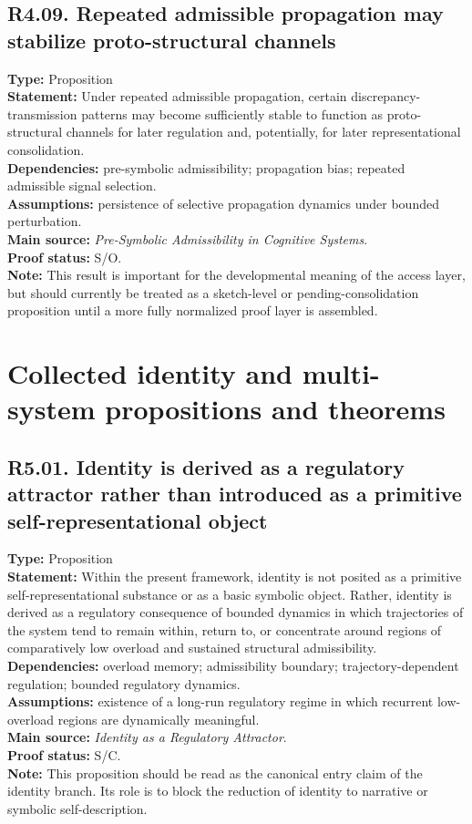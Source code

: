 \documentclass[12pt]{article}
\begin{document}
	\subsection*{R4.09. Repeated admissible propagation may stabilize proto-structural channels}
	\textbf{Type:} Proposition \\
	\textbf{Statement:} Under repeated admissible propagation, certain discrepancy-transmission
	patterns may become sufficiently stable to function as proto-structural channels for later
	regulation and, potentially, for later representational consolidation. \\
	\textbf{Dependencies:} pre-symbolic admissibility; propagation bias; repeated admissible signal
	selection. \\
	\textbf{Assumptions:} persistence of selective propagation dynamics under bounded perturbation. \\
	\textbf{Main source:} \emph{Pre-Symbolic Admissibility in Cognitive Systems}. \\
	\textbf{Proof status:} S/O. \\
	\textbf{Note:} This result is important for the developmental meaning of the access layer, but
	should currently be treated as a sketch-level or pending-consolidation proposition until a more
	fully normalized proof layer is assembled.
	
	\section{Collected identity and multi-system propositions and theorems}
	
	\subsection*{R5.01. Identity is derived as a regulatory attractor rather than introduced as a primitive self-representational object}
	\textbf{Type:} Proposition \\
	\textbf{Statement:} Within the present framework, identity is not posited as a primitive
	self-representational substance or as a basic symbolic object. Rather, identity is derived as a
	regulatory consequence of bounded dynamics in which trajectories of the system tend to remain
	within, return to, or concentrate around regions of comparatively low overload and sustained
	structural admissibility. \\
	\textbf{Dependencies:} overload memory; admissibility boundary; trajectory-dependent regulation;
	bounded regulatory dynamics. \\
	\textbf{Assumptions:} existence of a long-run regulatory regime in which recurrent low-overload
	regions are dynamically meaningful. \\
	\textbf{Main source:} \emph{Identity as a Regulatory Attractor}. \\
	\textbf{Proof status:} S/C. \\
	\textbf{Note:} This proposition should be read as the canonical entry claim of the identity
	branch. Its role is to block the reduction of identity to narrative or symbolic self-description.
	
\end{document}
